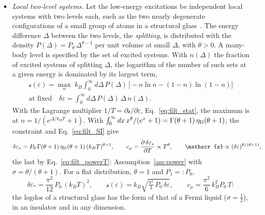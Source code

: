 \documentclass[10pt,a4paper]{article}
\theoremstyle{plain}
\newcommand{\lndos}{{logdos}}  %
\newcommand{\lds}{\mathscr{s}}  %
\newcommand{\etaD}{\eta_{\rm D}}  %
\begin{document}
\begin{itemize}
\item \emph{Local two-level systems.} Let the low-energy excitations be
  independent local systems with two levels each, such as the two nearly
  degenerate configurations of a small group of atoms in a structural
  glass~\cite{Anderson1972,Phillips1972}. The energy difference $\Delta$
  between the two levels, the \emph{splitting}, is distributed with the
  density $P(\Delta)=P_\theta\,\Delta^{\theta-1}$ per unit volume at small
  $\Delta$, with $\theta>0$. A many-body level is specified by the set of
  excited systems. With $n(\Delta)$ the fraction of excited systems of
  splitting $\Delta$, the logarithm of the number of such sets at a given
  energy is dominated by its largest term,
  \begin{gather*}
    \lds(\varepsilon)=\max_{n}\;k_B\int_0^{\infty}d\Delta\,P(\Delta)\,
    \big[-n\ln n-(1-n)\ln(1-n)\big]
    \\
    \text{at fixed}\quad
    \delta\varepsilon=\int_0^{\infty}d\Delta\,P(\Delta)\,\Delta\,n(\Delta) .
  \end{gather*}
  With the Lagrange multiplier $1/T=\partial\lds/\partial\varepsilon$,
  Eq.~\eqref{eq:filt_stat}, the maximum is at $n=1/(e^{\Delta/k_BT}+1)$. With
  $\int_0^{\infty}dx\,x^{\theta}/(e^{x}+1)=\Gamma(\theta+1)\,\etaD(\theta+1)$,
  the constraint and Eq.~\eqref{eq:filt_SI} give
  \begin{equation}\label{eq:filt_tls}
    \delta\varepsilon_*=P_\theta\,\Gamma(\theta+1)\,\etaD(\theta+1)\,(k_BT)^{\theta+1} ,\qquad
    c_\mu=\frac{\partial\,\delta\varepsilon_*}{\partial T}\propto T^{\theta} ,\qquad
    \lds\propto(\delta\varepsilon)^{\theta/(\theta+1)} ,
  \end{equation}
  the last by Eq.~\eqref{eq:filt_powerT}: Assumption~\ref{ass:power} with
  $\sigma=\theta/(\theta+1)$. For a flat distribution, $\theta=1$ and
  $P_1=:P_0$,
  \[
    \delta\varepsilon_*=\frac{\pi^{2}}{12}\,P_0\,(k_BT)^{2} ,\qquad
    \lds(\varepsilon)=k_B\sqrt{\tfrac{\pi^{2}}{3}\,P_0\,\delta\varepsilon} ,
    \qquad
    c_\mu=\frac{\pi^{2}}{6}\,k_B^{2}P_0\,T :
  \]
  the \lndos{} of a structural glass has the form of that of a Fermi liquid
  ($\sigma=\tfrac12$), in an insulator and in any dimension.


\end{itemize}
\end{document}
